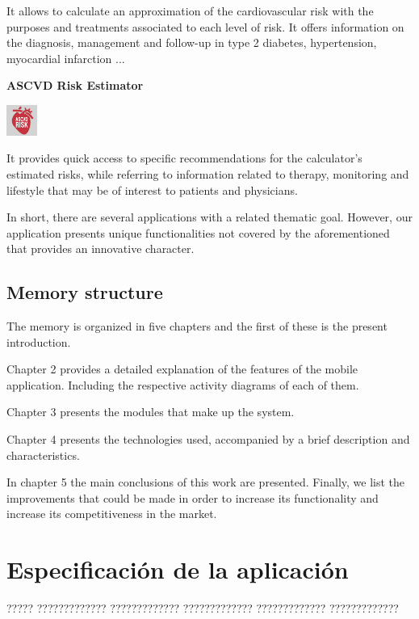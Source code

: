 \documentclass[11pt,spanish,
		listoftables,listoffigures]
		{tfgplantilla}
\begin{document}
\noindent
It allows to calculate an approximation of the cardiovascular risk with the purposes and treatments associated to each level of risk. It offers information on the diagnosis, management and follow-up in type 2 diabetes, hypertension, myocardial infarction ...

\noindent
\textbf {ASCVD Risk Estimator}

\noindent
\includegraphics[height=1cm]{ASCVD_icon.jpg}

\noindent
It provides quick access to specific recommendations for the calculator's estimated risks, while referring to information related to therapy, monitoring and lifestyle that may be of interest to patients and physicians.

In short, there are several applications with a related thematic goal. However, our application presents unique functionalities not covered by the aforementioned that provides an innovative character. 

\section{Memory structure}

The memory is organized in five chapters and the first of these is the present introduction.

Chapter 2 provides a detailed explanation of the features of the mobile application. Including the respective activity diagrams of each of them.

Chapter 3 presents the modules that make up the system.

Chapter 4 presents the technologies used, accompanied by a brief description and characteristics.

In chapter 5 the main conclusions of this work are presented. Finally, we list the improvements that could be made in order to increase its functionality and increase its competitiveness in the market.

\chapter{Especificación de la aplicaci\'on}

????? ????????????? ????????????? ????????????? ????????????? ?????????????
\end{document}
